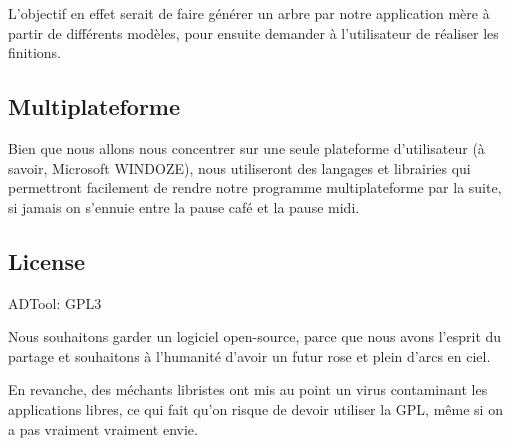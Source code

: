         L'objectif en effet serait de faire générer un arbre par notre application mère à partir de différents modèles, pour ensuite demander à l'utilisateur de réaliser les finitions.
    
	\subsection{Multiplateforme}
        Bien que nous allons nous concentrer sur une seule plateforme d'utilisateur (à savoir, Microsoft WINDOZE), nous utiliseront des langages et librairies qui permettront facilement de rendre notre programme multiplateforme par la suite, si jamais on s’ennuie entre la pause café et la pause midi.

    \subsection{License}
    	ADTool: GPL3
        
        Nous souhaitons garder un logiciel open-source, parce que nous avons l'esprit du partage et souhaitons à l'humanité d'avoir un futur rose et plein d'arcs en ciel.
        
        En revanche, des méchants libristes ont mis au point un virus contaminant les applications libres, ce qui fait qu'on risque de devoir utiliser la GPL, même si on a pas vraiment vraiment envie.